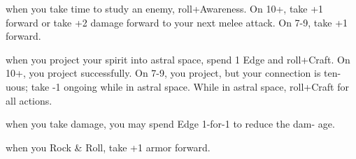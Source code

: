 \begin{dossier}
\begin{dossiermovebar}
         when you take time to study an enemy, roll+Awareness. On 10+, take +1 
          forward or take +2 damage forward to your next melee attack. On 7-9, take +1 forward. 

           when you project your spirit into astral space, spend 1 Edge and 
            roll+Craft. On 10+, you project successfully. On 7-9, you project, but your connection is ten- 
            uous; take -1 ongoing while in astral space. While in astral space, roll+Craft for all actions. 

             when you take damage, you may spend Edge 1-for-1 to reduce the dam- 
              age. 

               when you Rock \& Roll, take +1 armor forward. 

                

\end{dossiermovebar}%
\end{dossier}

